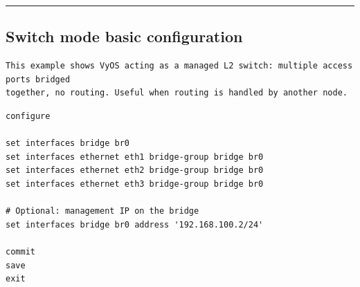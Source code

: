 \begin{center}\rule{0.5\linewidth}{0.5pt}\end{center}

\subsection{Switch mode basic configuration}

\begin{lstlisting}
This example shows VyOS acting as a managed L2 switch: multiple access ports bridged
together, no routing. Useful when routing is handled by another node.
\end{lstlisting}

\begin{lstlisting}
configure

set interfaces bridge br0
set interfaces ethernet eth1 bridge-group bridge br0
set interfaces ethernet eth2 bridge-group bridge br0
set interfaces ethernet eth3 bridge-group bridge br0

# Optional: management IP on the bridge
set interfaces bridge br0 address '192.168.100.2/24'

commit
save
exit
\end{lstlisting}
